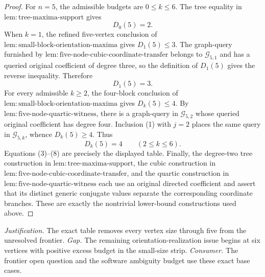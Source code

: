 \documentclass{article}
\begin{document}
\begin{proof}
For \(n=5\), the admissible budgets are \(0\leq k\leq6\).  The tree equality in \(\mathrm{lem:tree\mbox{-}maxima\mbox{-}support}\) gives
\[
 D_0(5)=2.
\tag{6}
\]
When \(k=1\), the refined five-vertex conclusion of \(\mathrm{lem:small\mbox{-}block\mbox{-}orientation\mbox{-}maxima}\) gives \(D_1(5)\leq3\).  The graph-query furnished by \(\mathrm{lem:five\mbox{-}node\mbox{-}cubic\mbox{-}coordinate\mbox{-}transfer}\) belongs to \(\mathcal G_{5,1}\) and has a queried original coefficient of degree three, so the definition of \(D_1(5)\) gives the reverse inequality.  Therefore
\[
 D_1(5)=3.
\tag{7}
\]
For every admissible \(k\geq2\), the four-block conclusion of \(\mathrm{lem:small\mbox{-}block\mbox{-}orientation\mbox{-}maxima}\) gives \(D_k(5)\leq4\).  By \(\mathrm{lem:five\mbox{-}node\mbox{-}quartic\mbox{-}witness}\), there is a graph-query in \(\mathcal G_{5,2}\) whose queried original coefficient has degree four.  Inclusion (1) with \(j=2\) places the same query in \(\mathcal G_{5,k}\), whence \(D_k(5)\geq4\).  Thus
\[
 D_k(5)=4\qquad(2\leq k\leq6).
\tag{8}
\]
Equations (3)--(8) are precisely the displayed table.  Finally, the degree-two tree construction in \(\mathrm{lem:tree\mbox{-}maxima\mbox{-}support}\), the cubic construction in \(\mathrm{lem:five\mbox{-}node\mbox{-}cubic\mbox{-}coordinate\mbox{-}transfer}\), and the quartic construction in \(\mathrm{lem:five\mbox{-}node\mbox{-}quartic\mbox{-}witness}\) each use an original directed coefficient and assert that its distinct generic conjugate values separate the corresponding coordinate branches.  These are exactly the nontrivial lower-bound constructions used above.
\end{proof}
\par\smallskip\noindent \textit{Justification.} The exact table removes every vertex size through five from the unresolved frontier. \textit{Gap.} The remaining orientation-realization issue begins at six vertices with positive excess budget in the small-size strip. \textit{Consumer.} The frontier open question and the software ambiguity budget use these exact base cases.
\end{document}
